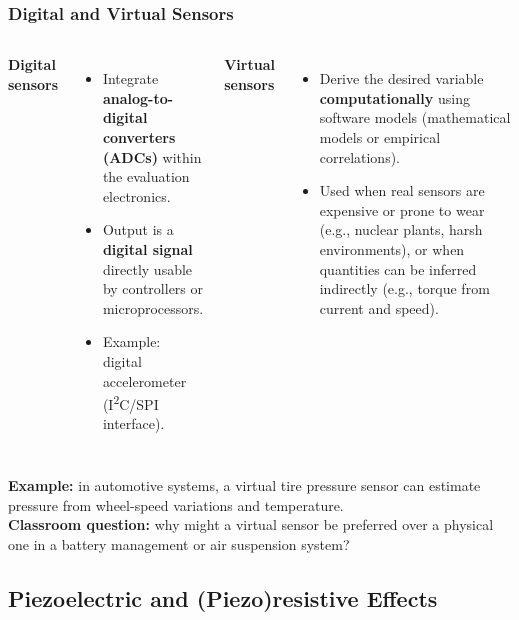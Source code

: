 \begin{frame}
	\frametitle{Digital and Virtual Sensors}
	\begin{columns}[T,onlytextwidth]
		\textbf{Digital sensors}
		\begin{itemize}
			\item Integrate \textbf{analog-to-digital converters (ADCs)} within the evaluation electronics.
			\item Output is a \textbf{digital signal} directly usable by controllers or microprocessors.
			\item Example: digital accelerometer (I\textsuperscript{2}C/SPI interface).
		\end{itemize}
		\textbf{Virtual sensors}
		\begin{itemize}
			\item Derive the desired variable \textbf{computationally} using software models (mathematical models or empirical correlations).
			\item Used when real sensors are expensive or prone to wear (e.g., nuclear plants, harsh environments), or when quantities can be inferred indirectly (e.g., torque from current and speed).
		\end{itemize}
	\end{columns}
	\vspace{1mm}
	\textbf{Example:} in automotive systems, a virtual tire pressure sensor can estimate pressure from wheel-speed variations and temperature.\\[2mm]
	\textbf{Classroom question:} why might a virtual sensor be preferred over a physical one in a battery management or air suspension system?
\end{frame}

\subsection{Piezoelectric and (Piezo)resistive Effects}


